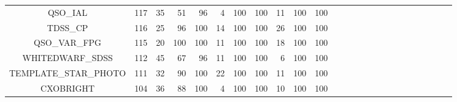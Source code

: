 \documentclass[onecolumn]{aa}
\begin{document}
\begin{center}
\begin{longtable}{c r rrrr rrrr rrrrr rrrrr rrrrr}
QSO\_IAL                 & 117    & 35     & 51  & 96  & 4     & 100 & 100  & 11 & 100 & 100 \\ 
TDSS\_CP                 & 116    & 25     & 96  & 100 & 14    & 100 & 100  & 26 & 100 & 100 \\ 
QSO\_VAR\_FPG            & 115    & 20     & 100 & 100 & 11    & 100 & 100  & 18 & 100 & 100 \\ 
WHITEDWARF\_SDSS         & 112    & 45     & 67  & 96  & 11    & 100 & 100  & 6 & 100 & 100 \\ 
TEMPLATE\_STAR\_PHOTO    & 111    & 32     & 90  & 100 & 22    & 100 & 100  & 11 & 100 & 100 \\ 
CXOBRIGHT                & 104    & 36     & 88  & 100 & 4     & 100 & 100  & 10 & 100 & 100 \\ 
\hline
\end{longtable}
\end{center}
\end{document}
